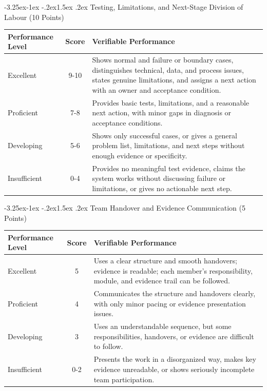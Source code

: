 \documentclass[11pt]{article}
\makeatletter
\renewcommand\subsection{\@startsection{subsection}{2}{\z@}%
    {-3.25ex\@plus -1ex \@minus -.2ex}{1.5ex \@plus .2ex}%
    {\normalfont\large\sffamily\bfseries}}
\newcommand{\formaltable}{%
  \small
  \setlength{\tabcolsep}{5pt}%
  \renewcommand{\arraystretch}{1.2}%
  \setlength{\arrayrulewidth}{0.4pt}%
}
\renewcommand{\arraystretch}{1.2}
\makeatother
\begin{document}
\subsection{Testing, Limitations, and Next-Stage Division of Labour (10 Points)}
\begin{center}
\formaltable
\begin{tabularx}{\textwidth}{|l|c|Y|}
\hline
\textbf{Performance Level} & \textbf{Score} & \textbf{Verifiable Performance} \\ \hline
Excellent & 9-10 & Shows normal and failure or boundary cases, distinguishes technical, data, and process issues, states genuine limitations, and assigns a next action with an owner and acceptance condition. \\ \hline
Proficient & 7-8 & Provides basic tests, limitations, and a reasonable next action, with minor gaps in diagnosis or acceptance conditions. \\ \hline
Developing & 5-6 & Shows only successful cases, or gives a general problem list, limitations, and next steps without enough evidence or specificity. \\ \hline
Insufficient & 0-4 & Provides no meaningful test evidence, claims the system works without discussing failure or limitations, or gives no actionable next step. \\ \hline
\end{tabularx}
\end{center}

\subsection{Team Handover and Evidence Communication (5 Points)}
\begin{center}
\formaltable
\begin{tabularx}{\textwidth}{|l|c|Y|}
\hline
\textbf{Performance Level} & \textbf{Score} & \textbf{Verifiable Performance} \\ \hline
Excellent & 5 & Uses a clear structure and smooth handovers; evidence is readable; each member's responsibility, module, and evidence trail can be followed. \\ \hline
Proficient & 4 & Communicates the structure and handovers clearly, with only minor pacing or evidence presentation issues. \\ \hline
Developing & 3 & Uses an understandable sequence, but some responsibilities, handovers, or evidence are difficult to follow. \\ \hline
Insufficient & 0-2 & Presents the work in a disorganized way, makes key evidence unreadable, or shows seriously incomplete team participation. \\ \hline
\end{tabularx}
\end{center}
\end{document}
